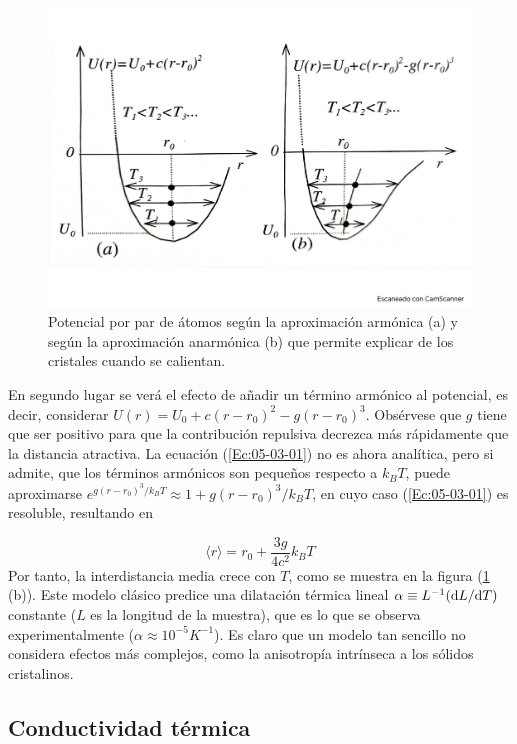 \begin{figure}[h!] \centering
    \includegraphics[scale=0.37]{Cuerpo/Ch_05/Fotos libro 5.pdf}
    \caption{Potencial por par de átomos según la aproximación armónica (a) y según la aproximación anarmónica (b) que permite explicar de los cristales cuando se calientan.}
    \label{Fig:05-05}
\end{figure}    

En segundo lugar se verá el efecto de añadir un término armónico al potencial, es decir, considerar $U(r) = U_0 + c(r-r_0)^2 - g(r-r_0)^3$. Obsérvese que $g$ tiene que ser positivo para que la contribución repulsiva decrezca más rápidamente que la distancia atractiva. La ecuación (\ref{Ec:05-03-01}) no es ahora analítica, pero si admite, que los términos armónicos son pequeños respecto a $k_BT$, puede aproximarse $e^{g(r-r_0)^3/k_BT} \approx 1 + g(r-r_0)^3 / k_BT$, en cuyo caso (\ref{Ec:05-03-01}) es resoluble, resultando en

\begin{equation}
    \langle r \rangle = r_0 + \frac{3g}{4c^2} k_B T
\end{equation}
Por tanto, la interdistancia media crece con $T$, como se muestra en la figura (\ref{Fig:05-05} (b)). Este modelo clásico predice una dilatación térmica lineal $\alpha \equiv L^{-1} (\mathrm{d} L / \mathrm{d} T)$ constante ($L$ es la longitud de la muestra), que es lo que se observa experimentalmente ($\alpha \approx 10^{-5} \unit{K^{-1}}$). Es claro que un modelo tan sencillo no considera efectos más complejos, como la anisotropía intrínseca a los sólidos cristalinos.

\subsection{Conductividad térmica}

